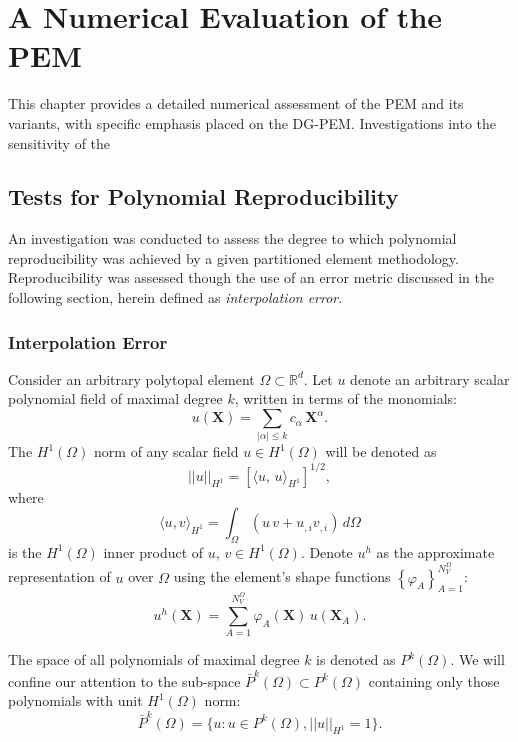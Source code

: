 \chapter{A Numerical Evaluation of the PEM} \label{ch:results}
%
This chapter provides a detailed numerical assessment of the PEM and its variants, with specific emphasis placed on the DG-PEM. Investigations into the sensitivity of the 

\section{Tests for Polynomial Reproducibility}

An investigation was conducted to assess the degree to which polynomial reproducibility was achieved by a given partitioned element methodology. Reproducibility was assessed though the use of an error metric discussed in the following section, herein defined as \textit{interpolation error}.

\subsection*{Interpolation Error}

Consider an arbitrary polytopal element $\Omega \subset \mathbb{R}^d$. Let $u$ denote an arbitrary scalar polynomial field of maximal degree $k$, written in terms of the monomials:
\begin{equation}
        u (\mathbf{X}) = \sum_{|\alpha| \leq k} c_{\alpha} \, \mathbf{X}^{\alpha}.
\end{equation}
The $H^1(\Omega)$ norm of any scalar field $u \in H^1(\Omega)$ will be denoted as
\begin{equation}
        ||u||_{H^1} = \left[ \langle u, \, u \rangle_{H^1} \right]^{1/2},
\end{equation}
where
\begin{equation}
       \langle u,v \rangle_{H^1} = \int_{\Omega} (u \, v + u_{,i} v_{,i}) \, d\Omega
\end{equation}
is the $H^1(\Omega)$ inner product of $u, \,v \in H^1(\Omega)$. Denote $u^h$ as the approximate representation of $u$ over $\Omega$ using the element's shape functions $\left\{ \varphi_A \right\}_{A=1}^{N^\Omega_V}$:
\begin{equation}
        u^h (\mathbf{X}) = \sum_{A = 1}^{N^{\Omega}_V} \varphi_A (\mathbf{X}) \, u(\mathbf{X}_A).
\end{equation}

The space of all polynomials of maximal degree $k$ is denoted as $P^k (\Omega)$. We will confine our attention to the sub-space $\bar{P}^k (\Omega) \subset P^k (\Omega)$ containing only those polynomials with unit $H^1 (\Omega)$ norm:
\begin{equation}
        \bar{P}^k (\Omega) = \{ u : u \in P^k (\Omega), ||u||_{H^1} = 1 \}.
\end{equation}

